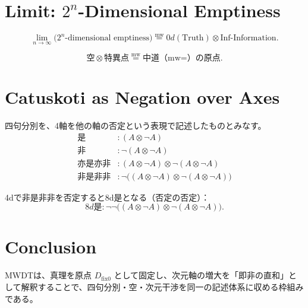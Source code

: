 \documentclass[uplatex,dvipdfmx,12pt,a4paper]{jsarticle}
\newcommand{\dfix}{D_{\text{fix0}}}
\newcommand{\mweq}{\mathrel{\overset{\mathrm{mw}}{=}}}
\begin{document}
\section{Limit: $2^n$-Dimensional Emptiness}
\begin{equation}
  \lim_{n\to\infty} \bigl(2^n\text{-dimensional emptiness}\bigr)
  \mweq
  0d(\text{Truth})\otimes \text{Inf-Information}.
\end{equation}

\begin{equation}
  \text{空}\otimes \text{特異点} \mweq \text{中道（mw=）の原点}.
\end{equation}

\section{Catuskoti as Negation over Axes}
四句分別を、4軸を他の軸の否定という表現で記述したものとみなす。
\begin{align}
  \text{是} &: (A\otimes \neg A)\\
  \text{非} &: \neg(A\otimes \neg A)\\
  \text{亦是亦非} &: (A\otimes \neg A)\otimes \neg(A\otimes \neg A)\\
  \text{非是非非} &: \neg\bigl((A\otimes \neg A)\otimes \neg(A\otimes \neg A)\bigr)
\end{align}

4dで非是非非を否定すると8d是となる（否定の否定）：
\begin{equation}
  8d\text{是} : \neg\neg\bigl((A\otimes \neg A)\otimes \neg(A\otimes \neg A)\bigr).
\end{equation}

\section{Conclusion}
MWDTは、真理を原点 $\dfix$ として固定し、次元軸の増大を「即非の直和」として解釈することで、四句分別・空・次元干渉を同一の記述体系に収める枠組みである。
\end{document}
